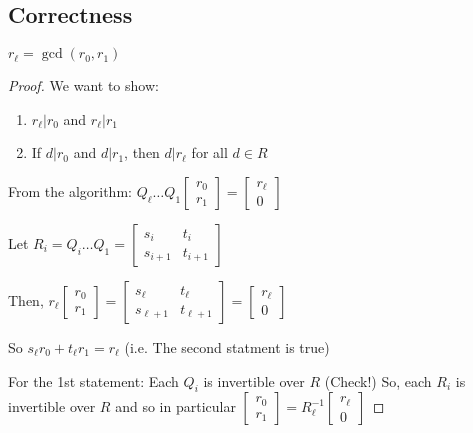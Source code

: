 \subsection{Correctness}
\begin{proposition}
    $r_{\ell} = \gcd(r_0, r_1)$
\end{proposition}
\begin{proof}
    We want to show:
    \begin{enumerate}
        \item $r_\ell | r_0$ and $r_\ell | r_1$
        \item If $d | r_0$ and $d | r_1$, then $d | r_\ell$ for all $d \in R$
    \end{enumerate}
    From the algorithm: $Q_\ell \ldots Q_1 \begin{bmatrix}r_0 \\ r_1 \end{bmatrix} = \begin{bmatrix}
        r_\ell \\ 0
    \end{bmatrix}$

    Let $R_i = Q_i\ldots Q_1 = \begin{bmatrix}
        s_i & t_i \\
        s_{i+1} & t_{i+1}
    \end{bmatrix}$

    Then, $r_\ell \begin{bmatrix}
        r_0 \\ r_1
    \end{bmatrix} = 
    \begin{bmatrix}
        s_\ell & t_\ell \\
        s_{\ell+1} & t_{\ell+1}
    \end{bmatrix}
    = 
    \begin{bmatrix}
        r_\ell \\ 0
    \end{bmatrix}$

    So $s_\ell r_0 + t_\ell r_1 = r_\ell$ (i.e. The second statment is true)

    For the 1st statement:
    Each $Q_i$ is invertible over $R$ (Check!) So, each $R_i$ is invertible over $R$ and so in particular $\begin{bmatrix}
        r_0 \\ r_1
    \end{bmatrix} = R_\ell^{-1}\begin{bmatrix}
        r_\ell \\ 0
    \end{bmatrix}$
\end{proof}

